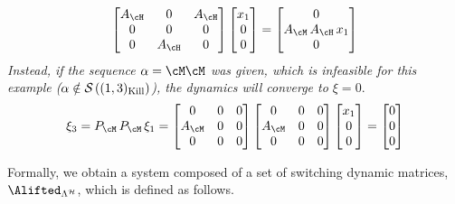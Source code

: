 {\begin{example}
\begin{equation*}
\begin{aligned}
\begin{bmatrix}
                A_\cH & 0 & A_\cH \\
                0 & 0 & 0 \\
                0 &  A_\cH & 0
            \end{bmatrix}
            \begin{bmatrix}
                x_1 \\
                0   \\
                0   \\
            \end{bmatrix} =
            \begin{bmatrix}
                0 \\
                A_\cM\, A_\cH\, x_1 \\
                0 \\
            \end{bmatrix}
        \end{aligned}
    \end{equation*}
    \emph{Instead, if the sequence $\alpha = \cM\cM$ was given, which is infeasible for this example (}$\alpha \notin \mathcal{S}_{}\left( (1,3)_{\text{Kill}}  \right)$\emph{), the dynamics will converge to $\xi=0$}.
    \begin{equation*}
        \xi_3 = P_\cM\, P_\cM\, \xi_1 =
        \begin{bmatrix}
            0 & 0 & 0 \\
            A_\cM & 0 & 0 \\
            0 & 0 & 0
        \end{bmatrix}
        \begin{bmatrix}
            0 & 0 & 0 \\
            A_\cM & 0 & 0 \\
            0 & 0 & 0
        \end{bmatrix}
        \begin{bmatrix}
            x_1 \\
            0   \\
            0
        \end{bmatrix} =
        \begin{bmatrix}
            0 \\
            0 \\
            0
        \end{bmatrix}
    \end{equation*}%
\end{example}}%
%
Formally, we obtain a system composed of a set of switching dynamic matrices, $\Alifted_{\Lambda^\strat}$, which is defined as follows.
